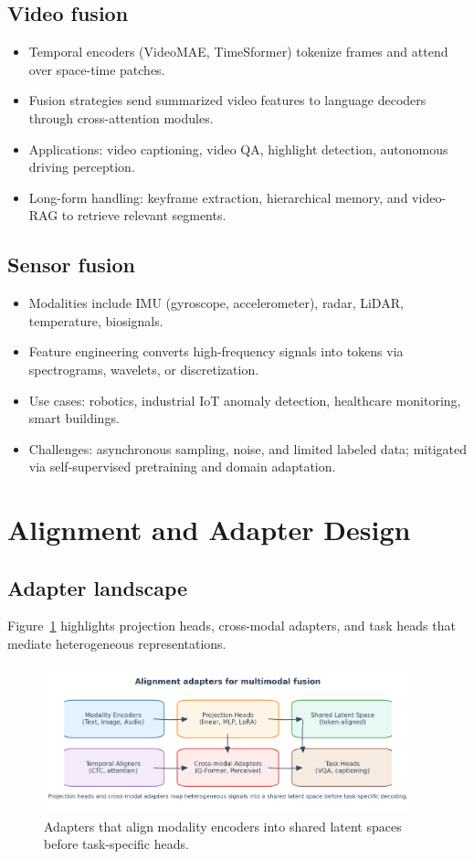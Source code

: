 \documentclass{article}
\begin{document}
\subsection{Video fusion}
\begin{itemize}
  \item Temporal encoders (VideoMAE, TimeSformer) tokenize frames and attend over space-time patches.
  \item Fusion strategies send summarized video features to language decoders through cross-attention modules.
  \item Applications: video captioning, video QA, highlight detection, autonomous driving perception.
  \item Long-form handling: keyframe extraction, hierarchical memory, and video-RAG to retrieve relevant segments.
\end{itemize}

\subsection{Sensor fusion}
\begin{itemize}
  \item Modalities include IMU (gyroscope, accelerometer), radar, LiDAR, temperature, biosignals.
  \item Feature engineering converts high-frequency signals into tokens via spectrograms, wavelets, or discretization.
  \item Use cases: robotics, industrial IoT anomaly detection, healthcare monitoring, smart buildings.
  \item Challenges: asynchronous sampling, noise, and limited labeled data; mitigated via self-supervised pretraining and domain adaptation.
\end{itemize}

\section{Alignment and Adapter Design}
\subsection{Adapter landscape}
Figure~\ref{fig:alignment_adapters_en} highlights projection heads, cross-modal adapters, and task heads that mediate heterogeneous representations.
\begin{figure}[H]
  \centering
  \includegraphics[width=0.95\textwidth]{alignment_adapters.png}
  \caption{Adapters that align modality encoders into shared latent spaces before task-specific heads.}
  \label{fig:alignment_adapters_en}
\end{figure}
\end{document}
